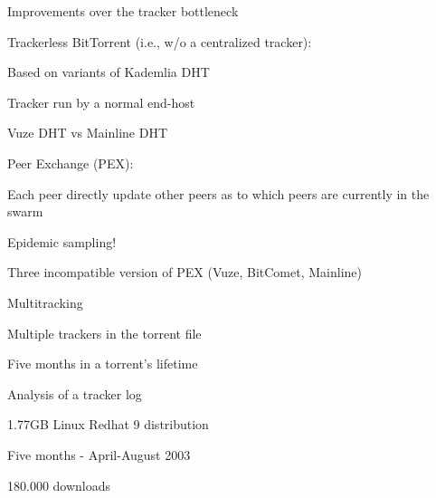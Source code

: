 \begin{frame}{Improvements over the tracker bottleneck}

\BIL
\item \alert{Trackerless BitTorrent} (i.e., w/o a centralized tracker):
\BI
\item Based on variants of Kademlia DHT
\item Tracker run by a normal end-host
\item Vuze DHT vs Mainline DHT
\EI
\item \alert{Peer Exchange (PEX)}:
\BI
\item Each peer directly update other peers as to which peers are currently in the swarm
\item Epidemic sampling!
\item Three incompatible version of PEX (Vuze, BitComet, Mainline)
\EI
\item \alert{Multitracking}
\BI
\item Multiple trackers in the torrent file
\EI
\EIL

\end{frame}

\begin{frame}{Five months in a torrent's lifetime}
	
	
\BI
\item Analysis of a tracker log
\item 1.77GB Linux Redhat 9 distribution
\item Five months - April-August 2003
\item 180.000 downloads
\EI	

\bigskip
\begin{Bib}
{\scriptsize
{} 
}
\end{Bib}	

	
\end{frame}


